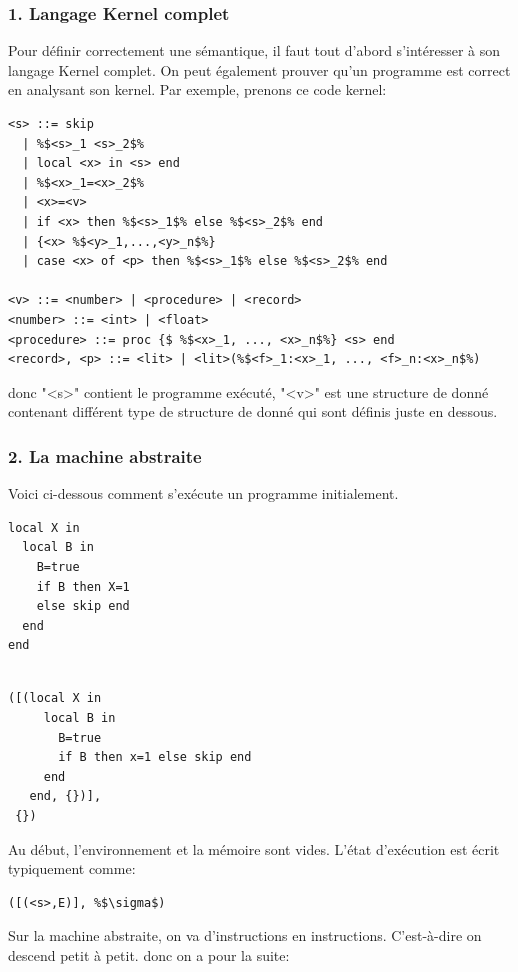\documentclass{report}
\begin{document}
\subsubsection{1. Langage Kernel complet}
Pour définir correctement une sémantique, il faut tout d'abord s'intéresser à son langage Kernel complet. On peut également prouver qu'un programme est correct en analysant son kernel. Par exemple, prenons ce code kernel:
\begin{lstlisting}[escapechar=\%]
<s> ::= skip 
  | %$<s>_1 <s>_2$% 
  | local <x> in <s> end 
  | %$<x>_1=<x>_2$% 
  | <x>=<v> 
  | if <x> then %$<s>_1$% else %$<s>_2$% end 
  | {<x> %$<y>_1,...,<y>_n$%} 
  | case <x> of <p> then %$<s>_1$% else %$<s>_2$% end

<v> ::= <number> | <procedure> | <record>  
<number> ::= <int> | <float> 
<procedure> ::= proc {$ %$<x>_1, ..., <x>_n$%} <s> end
<record>, <p> ::= <lit> | <lit>(%$<f>_1:<x>_1, ..., <f>_n:<x>_n$%)
\end{lstlisting}
donc "<s>" contient le programme exécuté, "<v>" est une structure de donné contenant différent type de structure de donné qui sont définis juste en dessous. 

\subsubsection{2. La machine abstraite}
Voici ci-dessous comment s'exécute un programme initialement.

\begin{minipage}[t]{0.45\linewidth}
\begin{lstlisting}[caption={Programme en Oz}]
local X in
  local B in
    B=true
    if B then X=1 
    else skip end
  end
end
  
\end{lstlisting}
\end{minipage}
%
\begin{minipage}[t]{0.45\linewidth}
\begin{lstlisting}[caption={État initial}]
([(local X in 
     local B in 
       B=true
       if B then x=1 else skip end
     end
   end, {})],
 {})
\end{lstlisting}
\end{minipage}

Au début, l'environnement et la mémoire sont vides. L'état d'exécution est écrit typiquement comme:
\begin{lstlisting}[escapechar=\%]
([(<s>,E)], %$\sigma$)
\end{lstlisting} %
Sur la machine abstraite, on va d'instructions en instructions. C'est-à-dire on descend petit à petit.
donc on a pour la suite:
\end{document}
